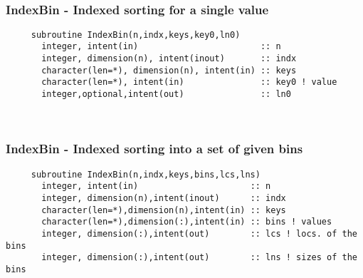  
\mbox{}\hrulefill\ 
 
\subsubsection{IndexBin - Indexed sorting for a single value}
 
\begin{verbatim} 
     subroutine IndexBin(n,indx,keys,key0,ln0)
       integer, intent(in)                        :: n
       integer, dimension(n), intent(inout)       :: indx
       character(len=*), dimension(n), intent(in) :: keys
       character(len=*), intent(in)               :: key0 ! value
       integer,optional,intent(out)               :: ln0
 \end{verbatim}
%
 
 
\mbox{}\hrulefill\ 
 
  \subsubsection{IndexBin - Indexed sorting into a set of given bins}

\begin{verbatim} 
     subroutine IndexBin(n,indx,keys,bins,lcs,lns)
       integer, intent(in)                      :: n
       integer, dimension(n),intent(inout)      :: indx
       character(len=*),dimension(n),intent(in) :: keys
       character(len=*),dimension(:),intent(in) :: bins ! values
       integer, dimension(:),intent(out)        :: lcs ! locs. of the bins
       integer, dimension(:),intent(out)        :: lns ! sizes of the bins
 \end{verbatim}
%
 
 
